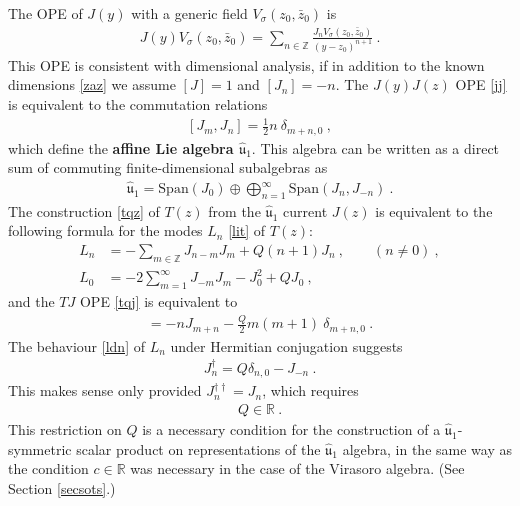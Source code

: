 \documentclass[12pt,a4paper,notitlepage]{report}
\numberwithin{equation}{section}
\theoremstyle{break}
\begin{document}
The OPE of $J(y)$ with a generic field $V_\sigma(z_0,\bar{z}_0)$ is 
\begin{align}
 \boxed{J(y) V_\sigma(z_0,\bar{z}_0) = \sum_{n\in {\mathbb{Z}}} \frac{J_n V_\sigma(z_0,\bar{z}_0)}{(y-z_0)^{n+1}}}\ .
\label{jvn}
\end{align}
This OPE is consistent with dimensional analysis, if in addition to the known dimensions \eqref{zaz} we assume $[J]=1$ and $[J_n]=-n$.
The $J(y)J(z)$ OPE \eqref{jj} is equivalent to the commutation relations
\begin{align}
 \boxed{ [J_m,J_n] =  \frac12 n\ \delta_{m+n,0}}\ ,
\label{jmjn}
\end{align}
which define the  \textbf{\boldmath affine Lie algebra $\hat{\mathfrak{u}}_1$}.
This algebra can be written as a direct sum of commuting finite-dimensional subalgebras as 
\begin{align}
 \hat{\mathfrak{u}}_1 = \text{Span}(J_0) \oplus \bigoplus_{n=1}^\infty \text{Span}(J_n,J_{-n}) \ .
\end{align}
The construction \eqref{tqz} of $T(z)$ from the $\hat{\mathfrak{u}}_1$ current $J(z)$ is equivalent to the following formula for the modes $L_n$ \eqref{lit} of $T(z)$:
\begin{align}
 L_n &= -\sum_{m\in{\mathbb{Z}}} J_{n-m}J_m + Q(n+1)J_n\ , \qquad (n\neq 0)\ ,
\label{lnj}
\\
L_0 &=-2\sum_{m=1}^\infty J_{-m}J_m -J_0^2+QJ_0 \ ,
\label{lzj}
\end{align}
and the $TJ$ OPE \eqref{tqj} is equivalent to 
\begin{align}
 [L_m,J_n] = -nJ_{m+n} -\frac{Q}{2}m(m+1)\ \delta_{m+n,0} \ . 
\end{align}
The behaviour \eqref{ldn} of $L_n$ under Hermitian conjugation suggests 
\begin{align}
 J_n^\dagger = Q\delta_{n,0}-J_{-n}\ .
\label{jdq}
\end{align}
This makes sense only provided $J_n^{\dagger \dagger} =J_n$, which requires 
\begin{align}
 Q \in {\mathbb{R}} \ .
\label{qir}
\end{align}
This restriction on $Q$ is a necessary condition for the construction of a $\hat{\mathfrak{u}}_1$-symmetric scalar product on representations of the $\hat{\mathfrak{u}}_1$ algebra, in the same way as the condition $c\in {\mathbb{R}}$ was necessary in the case of the Virasoro algebra. (See Section \ref{secsots}.)
\end{document}
